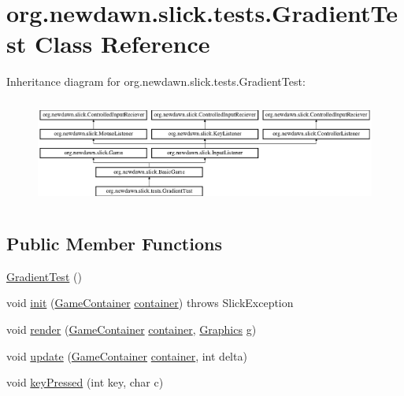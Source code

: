 \hypertarget{classorg_1_1newdawn_1_1slick_1_1tests_1_1_gradient_test}{}\section{org.\+newdawn.\+slick.\+tests.\+Gradient\+Test Class Reference}
\label{classorg_1_1newdawn_1_1slick_1_1tests_1_1_gradient_test}
Inheritance diagram for org.\+newdawn.\+slick.\+tests.\+Gradient\+Test\+:\begin{figure}[H]
\begin{center}
\leavevmode
\includegraphics[height=3.522012cm]{classorg_1_1newdawn_1_1slick_1_1tests_1_1_gradient_test}
\end{center}
\end{figure}
\subsection*{Public Member Functions}
\begin{DoxyCompactItemize}
\item 
\mbox{\hyperlink{classorg_1_1newdawn_1_1slick_1_1tests_1_1_gradient_test_a0da912dd0675beeff88038b89cfd68ce}{Gradient\+Test}} ()
\item 
void \mbox{\hyperlink{classorg_1_1newdawn_1_1slick_1_1tests_1_1_gradient_test_a369861c9b1682bd30e9c8b96f0d677d9}{init}} (\mbox{\hyperlink{classorg_1_1newdawn_1_1slick_1_1_game_container}{Game\+Container}} \mbox{\hyperlink{classorg_1_1newdawn_1_1slick_1_1tests_1_1_gradient_test_ae50800331ae38b8083556139b8d7d6ef}{container}})  throws Slick\+Exception 
\item 
void \mbox{\hyperlink{classorg_1_1newdawn_1_1slick_1_1tests_1_1_gradient_test_a4982e3f9ee29cc1bb91a37f9a4009de7}{render}} (\mbox{\hyperlink{classorg_1_1newdawn_1_1slick_1_1_game_container}{Game\+Container}} \mbox{\hyperlink{classorg_1_1newdawn_1_1slick_1_1tests_1_1_gradient_test_ae50800331ae38b8083556139b8d7d6ef}{container}}, \mbox{\hyperlink{classorg_1_1newdawn_1_1slick_1_1_graphics}{Graphics}} g)
\item 
void \mbox{\hyperlink{classorg_1_1newdawn_1_1slick_1_1tests_1_1_gradient_test_ad4a28cd7a550a10dd69aa99b6fdad22e}{update}} (\mbox{\hyperlink{classorg_1_1newdawn_1_1slick_1_1_game_container}{Game\+Container}} \mbox{\hyperlink{classorg_1_1newdawn_1_1slick_1_1tests_1_1_gradient_test_ae50800331ae38b8083556139b8d7d6ef}{container}}, int delta)
\item 
void \mbox{\hyperlink{classorg_1_1newdawn_1_1slick_1_1tests_1_1_gradient_test_a66122224e60b5482cc4706d35886ee57}{key\+Pressed}} (int key, char c)
\end{DoxyCompactItemize}
